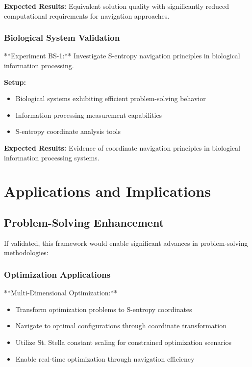 \documentclass[12pt,a4paper]{article}
\begin{document}
\textbf{Expected Results:} Equivalent solution quality with significantly reduced computational requirements for navigation approaches.

\subsubsection{Biological System Validation}

**Experiment BS-1:** Investigate S-entropy navigation principles in biological information processing.

\textbf{Setup:}
\begin{itemize}
\item Biological systems exhibiting efficient problem-solving behavior
\item Information processing measurement capabilities
\item S-entropy coordinate analysis tools
\end{itemize}

\textbf{Expected Results:} Evidence of coordinate navigation principles in biological information processing systems.

\section{Applications and Implications}

\subsection{Problem-Solving Enhancement}

If validated, this framework would enable significant advances in problem-solving methodologies:

\subsubsection{Optimization Applications}

**Multi-Dimensional Optimization:**
\begin{itemize}
\item Transform optimization problems to S-entropy coordinates
\item Navigate to optimal configurations through coordinate transformation
\item Utilize St. Stella constant scaling for constrained optimization scenarios
\item Enable real-time optimization through navigation efficiency
\end{itemize}
\end{document}
